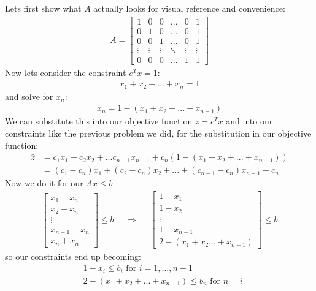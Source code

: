 \documentclass{article}
\begin{document}
Lets first show what $A$ actually looks for visual reference and convenience:
\begin{align*} A = 
    \begin{bmatrix}
        1 & 0 & 0 & ... & 0 & 1 \\
        0 & 1 & 0 & ... & 0 & 1 \\
        0 & 0 & 1 & ... & 0 & 1 \\ 
        \vdots & \vdots & \vdots & \ddots & \vdots & \vdots \\
        0 & 0 & 0 & ... & 1 & 1
    \end{bmatrix}
\end{align*}
Now lets consider the constraint $e^Tx = 1$:
\begin{align*}
    x_1 + x_2 + ... + x_n = 1
\end{align*}
and solve for $x_n$:
\begin{align*}
    x_n = 1 - (x_1 + x_2 + ... + x_{n-1})
\end{align*}
We can substitute this into our objective function $z = c^Tx$ and into our constraints like the previous problem we did, for the substitution in our objective function:
\begin{align*}
    \hat{z} &= c_1x_1 + c_2x_2 + ... c_{n-1}x_{n-1} + c_n(1 - (x_1 + x_2 + ... +x_{n-1})) \\ 
    &= (c_1-c_n)x_1 + (c_2-c_n)x_2 + ... + (c_{n-1} - c_n)x_{n-1} + c_n
\end{align*}
Now we do it for our $Ax \leq b$
\begin{align*}
    \begin{bmatrix}
        x_1 + x_n \\
        x_2 + x_n \\
        \vdots \\
        x_{n-1} + x_n \\
        x_n + x_n
    \end{bmatrix} \leq b && \Rightarrow &&
    \begin{bmatrix}
        1 - x_1 \\
        1 - x_2 \\
        \vdots \\
        1 - x_{n-1} \\
        2 - (x_1 + x_2... + x_{n-1})  
    \end{bmatrix} \leq b
\end{align*}
so our constraints end up becoming:
\begin{align*}
    & 1 - x_i \leq b_i \text{ for } i = 1,...,n-1\\
    & 2 - (x_1 + x_2 + ... + x_{n-1}) \leq b_n \text{ for } n = i
\end{align*}
\end{document}
